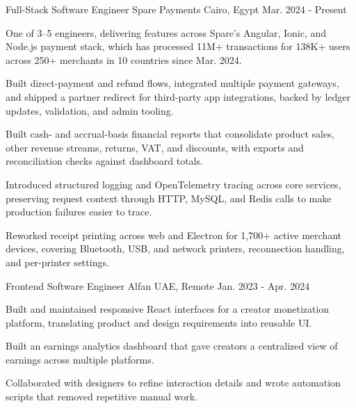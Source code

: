 

\begin{cventries}

  \cventry
    {Full-Stack Software Engineer} %
    {Spare Payments} %
    {Cairo, Egypt} %
    {Mar. 2024 - Present} %
    {
      \begin{cvitems} %
        \item {One of 3--5 engineers, delivering features across Spare's Angular, Ionic, and Node.js payment stack, which has processed 11M+ transactions for 138K+ users across 250+ merchants in 10 countries since Mar. 2024.}
        \item {Built direct-payment and refund flows, integrated multiple payment gateways, and shipped a partner redirect for third-party app integrations, backed by ledger updates, validation, and admin tooling.}
        \item {Built cash- and accrual-basis financial reports that consolidate product sales, other revenue streams, returns, VAT, and discounts, with exports and reconciliation checks against dashboard totals.}
        \item {Introduced structured logging and OpenTelemetry tracing across core services, preserving request context through HTTP, MySQL, and Redis calls to make production failures easier to trace.}
        \item {Reworked receipt printing across web and Electron for 1,700+ active merchant devices, covering Bluetooth, USB, and network printers, reconnection handling, and per-printer settings.}
      \end{cvitems}
    }

\vspace{1.5mm}

  \cventry
    {Frontend Software Engineer} %
    {Alfan} %
    {UAE, Remote} %
    {Jan. 2023 - Apr. 2024} %
    {
      \begin{cvitems} %
        \item {Built and maintained responsive React interfaces for a creator monetization platform, translating product and design requirements into reusable UI.}        \item {Built an earnings analytics dashboard that gave creators a centralized view of earnings across multiple platforms.}
        \item {Collaborated with designers to refine interaction details and wrote automation scripts that removed repetitive manual work.}
      \end{cvitems}
    }


\end{cventries}
